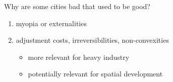 \documentclass[
  ignorenonframetext,
  aspectratio=16,
]{beamer}
\providecommand{\tightlist}{%
  \setlength{\itemsep}{0pt}\setlength{\parskip}{0pt}}
\begin{document}
\begin{frame}{Why are some cities bad that used to be good?}
\protect\hypertarget{why-are-some-cities-bad-that-used-to-be-good}{}
\begin{enumerate}
\tightlist
\item
  myopia or externalities
\item
  adjustment costs, irreversibilities, non-convexities

  \begin{itemize}
  \tightlist
  \item
    more relevant for heavy industry
  \item
    potentially relevant for spatial development
  \end{itemize}
\end{enumerate}
\end{frame}
\end{document}
